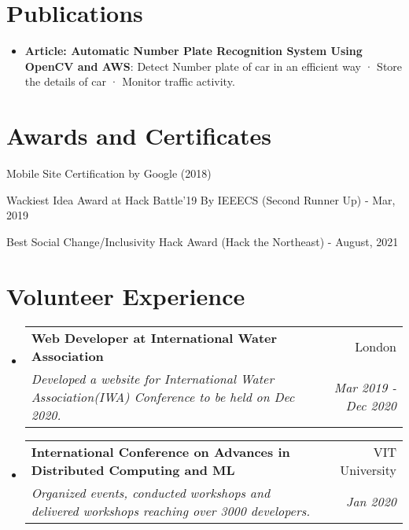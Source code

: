 \documentclass[a4paper,20pt]{article}
\makeatletter
\newcommand{\resumeItem}[2]{
  \item\small{
    \textbf{#1}{: #2 \vspace{-2pt}}
  }
}
\newcommand{\resumeSubheading}[4]{
  \vspace{-1pt}\item
    \begin{tabular*}{0.97\textwidth}{l@{\extracolsep{\fill}}r}
      \textbf{#1} & #2 \\
      \textit{#3} & \textit{#4} \\
    \end{tabular*}\vspace{-5pt}
}
\newcommand{\resumeSubItem}[2]{\resumeItem{#1}{#2}\vspace{-3pt}}
\newcommand{\resumeSubHeadingListStart}{\begin{itemize}[leftmargin=*]}
\newcommand{\resumeSubHeadingListEnd}{\end{itemize}}
\makeatother
\begin{document}
\section{Publications}
\resumeSubHeadingListStart
\resumeSubItem{Article: Automatic Number Plate Recognition System Using OpenCV and AWS}{Detect Number plate of car in an efficient way · Store the details of car · Monitor traffic activity.}
\vspace{2pt}
\resumeSubHeadingListEnd
\vspace{-5pt}
\section{Awards and Certificates}
\begin{description}[font=$\bullet$]
\item {Mobile Site Certification by Google (2018)}
\item {Wackiest Idea Award at Hack
Battle’19 By IEEECS (Second Runner Up) - Mar, 2019}
\vspace{-5pt}
\item {Best Social Change/Inclusivity Hack Award (Hack the Northeast) - August, 2021}

\end{description}

\vspace{-5pt}
\section{Volunteer Experience}
  \resumeSubHeadingListStart
	\resumeSubheading{Web Developer at International Water Association}{London}
    {Developed a website for International Water Association(IWA) Conference to be held on Dec 2020.}{Mar 2019 - Dec 2020}
\vspace{5pt}
    \resumeSubheading{International Conference on Advances in Distributed Computing and ML}{VIT University}
    {Organized events, conducted workshops and delivered workshops reaching over 3000 developers.}{Jan 2020}

\resumeSubHeadingListEnd
\end{document}
